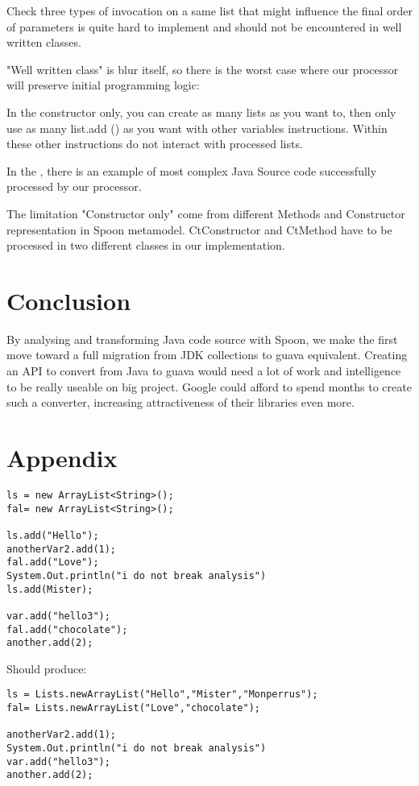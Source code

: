 \documentclass[paper=a4, fontsize=11pt]{scrartcl}
\numberwithin{equation}{section}%
\numberwithin{figure}{section}%
\numberwithin{table}{section}%
\begin{document}
Check three types of invocation on a same list that might influence
the final order of parameters is quite hard to implement and should
not be encountered in well written classes. \newline




"Well written class" is blur itself, so there is the worst case where
our processor will preserve initial programming logic:

In the constructor only, you can create as many lists as you want to,
then only use as many list.add () as you want with other variables
instructions. Within these other instructions do not interact with
processed lists.\newline

In the , there is an example of most complex Java Source code
successfully processed by our processor.\newline

The limitation "Constructor only" come from different Methods and
Constructor representation  in Spoon metamodel. CtConstructor and
CtMethod have to be processed in two different classes in our
implementation.

\section{Conclusion}

By analysing and transforming Java code source with Spoon, we make the
first move toward a full migration from JDK collections to guava
equivalent. Creating an API to convert from Java to guava would need a
lot of work and intelligence to be really useable on big
project. Google could afford to spend months to create such a
converter, increasing attractiveness of their libraries even more.  

\newpage
\appendix
\section{Appendix}
\label{app:one}
\begin{verbatim}
ls = new ArrayList<String>(); 
fal= new ArrayList<String>();

ls.add("Hello");
anotherVar2.add(1);
fal.add("Love");
System.Out.println("i do not break analysis")
ls.add(Mister);

var.add("hello3");
fal.add("chocolate");
another.add(2);
\end{verbatim}
Should produce:
\begin{verbatim}
ls = Lists.newArrayList("Hello","Mister","Monperrus"); 
fal= Lists.newArrayList("Love","chocolate");

anotherVar2.add(1);
System.Out.println("i do not break analysis")
var.add("hello3");
another.add(2);
\end{verbatim}
\end{document}
